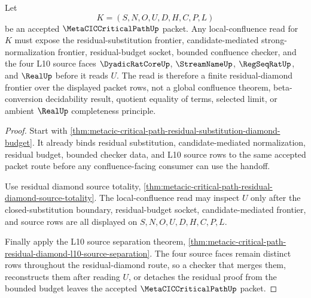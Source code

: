 \begin{theorem}\label{thm:metacic-critical-path-residual-diamond-local-confluence-frontier}
Let
$$
K=(S,N,O,U,D,H,C,P,L)
$$
be an accepted $\MetaCICCriticalPathUp$ packet. Any local-confluence read for $K$ must expose the residual-substitution frontier, candidate-mediated strong-normalization frontier, residual-budget socket, bounded confluence checker, and the four L10 source faces $\DyadicRatCoreUp$, $\StreamNameUp$, $\RegSeqRatUp$, and $\RealUp$ before it reads $U$. The read is therefore a finite residual-diamond frontier over the displayed packet rows, not a global confluence theorem, beta-conversion decidability result, quotient equality of terms, selected limit, or ambient $\RealUp$ completeness principle.
\end{theorem}
\begin{proof}
Start with \autoref{thm:metacic-critical-path-residual-substitution-diamond-budget}. It already binds residual substitution, candidate-mediated normalization, residual budget, bounded checker data, and L10 source rows to the same accepted packet route before any confluence-facing consumer can use the handoff.

Use residual diamond source totality, \autoref{thm:metacic-critical-path-residual-diamond-source-totality}. The local-confluence read may inspect $U$ only after the closed-substitution boundary, residual-budget socket, candidate-mediated frontier, and source rows are all displayed on $S,N,O,U,D,H,C,P,L$.

Finally apply the L10 source separation theorem, \autoref{thm:metacic-critical-path-residual-diamond-l10-source-separation}. The four source faces remain distinct rows throughout the residual-diamond route, so a checker that merges them, reconstructs them after reading $U$, or detaches the residual proof from the bounded budget leaves the accepted $\MetaCICCriticalPathUp$ packet.
\end{proof}

